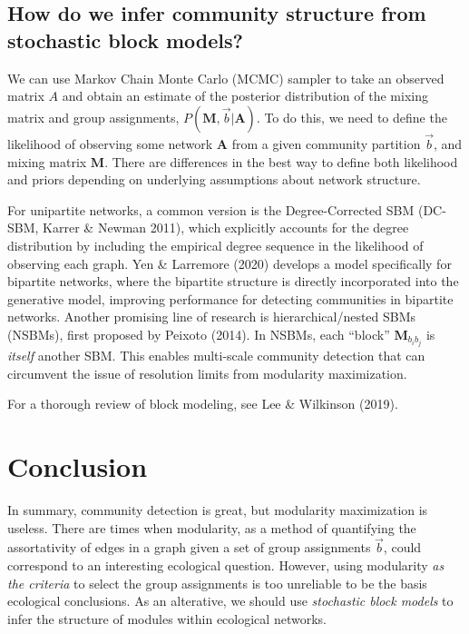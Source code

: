 \documentclass[
]{article}
\begin{document}
\hypertarget{how-do-we-infer-community-structure-from-stochastic-block-models}{%
\subsection{How do we infer community structure from stochastic block
models?}\label{how-do-we-infer-community-structure-from-stochastic-block-models}}

We can use Markov Chain Monte Carlo (MCMC) sampler to take an observed
matrix \(A\) and obtain an estimate of the posterior distribution of the
mixing matrix and group assignments,
\(P(\mathbf{M}, \vec{b} | \mathbf{A})\). To do this, we need to define
the likelihood of observing some network \(\mathbf{A}\) from a given
community partition \(\vec{b}\), and mixing matrix \(\mathbf{M}\). There
are differences in the best way to define both likelihood and priors
depending on underlying assumptions about network structure.

For unipartite networks, a common version is the Degree-Corrected SBM
(DC-SBM, Karrer \& Newman 2011), which explicitly accounts for the
degree distribution by including the empirical degree sequence in the
likelihood of observing each graph. Yen \& Larremore (2020) develops a
model specifically for bipartite networks, where the bipartite structure
is directly incorporated into the generative model, improving
performance for detecting communities in bipartite networks. Another
promising line of research is hierarchical/nested SBMs (NSBMs), first
proposed by Peixoto (2014). In NSBMs, each ``block''
\(\mathbf{M}_{b_i b_j}\) is \emph{itself} another SBM. This enables
multi-scale community detection that can circumvent the issue of
resolution limits from modularity maximization.

For a thorough review of block modeling, see Lee \& Wilkinson (2019).

\hypertarget{conclusion}{%
\section{Conclusion}\label{conclusion}}

In summary, community detection is great, but modularity maximization is
useless. There are times when modularity, as a method of quantifying the
assortativity of edges in a graph given a set of group assignments
\(\vec{b}\), could correspond to an interesting ecological question.
However, using modularity \emph{as the criteria} to select the group
assignments is too unreliable to be the basis ecological conclusions. As
an alterative, we should use \emph{stochastic block models} to infer the
structure of modules within ecological networks.
\end{document}
